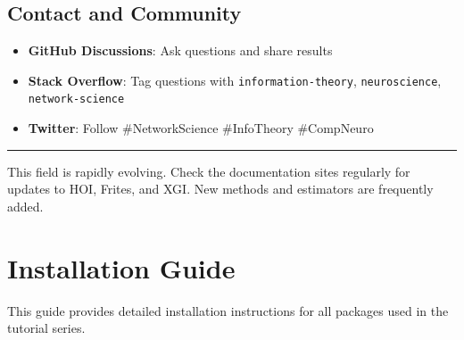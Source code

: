 \documentclass[
  11pt,
  letterpaper,
  oneside,
  openany]{book}
\providecommand{\tightlist}{%
  \setlength{\itemsep}{0pt}\setlength{\parskip}{0pt}}
\begin{document}
\section*{Contact and Community}\label{contact-and-community}


\begin{itemize}
\tightlist
\item
  \textbf{GitHub Discussions}: Ask questions and share results
\item
  \textbf{Stack Overflow}: Tag questions with
  \texttt{information-theory}, \texttt{neuroscience},
  \texttt{network-science}
\item
  \textbf{Twitter}: Follow \#NetworkScience \#InfoTheory \#CompNeuro
\end{itemize}

\begin{center}\rule{0.5\linewidth}{0.5pt}\end{center}

\begin{tcolorbox}[enhanced jigsaw, coltitle=black, breakable, colframe=quarto-callout-note-color-frame, bottomrule=.15mm, colbacktitle=quarto-callout-note-color!10!white, title=\textcolor{quarto-callout-note-color}{\faInfo}\hspace{0.5em}{Keeping Current}, opacitybacktitle=0.6, bottomtitle=1mm, toptitle=1mm, arc=.35mm, left=2mm, colback=white, rightrule=.15mm, titlerule=0mm, leftrule=.75mm, toprule=.15mm, opacityback=0]

This field is rapidly evolving. Check the documentation sites regularly
for updates to HOI, Frites, and XGI. New methods and estimators are
frequently added.

\end{tcolorbox}

\cleardoublepage
{}
{}
\appendix

\chapter*{Installation Guide}\label{installation-guide}


This guide provides detailed installation instructions for all packages
used in the tutorial series.
\end{document}
